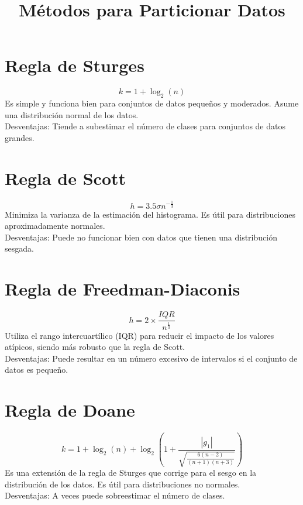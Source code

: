 \documentclass{article}
\title{Métodos para Particionar Datos}
\date{}
\begin{document}
\maketitle

\section{Regla de Sturges}
\begin{equation}
k = 1 + \log_2(n)
\end{equation}
Es simple y funciona bien para conjuntos de datos pequeños y moderados. Asume una distribución normal de los datos. \\
Desventajas: Tiende a subestimar el número de clases para conjuntos de datos grandes.

\section{Regla de Scott}
\begin{equation}
h = 3.5\sigma n^{-\frac{1}{3}}
\end{equation}
Minimiza la varianza de la estimación del histograma. Es útil para distribuciones aproximadamente normales. \\
Desventajas: Puede no funcionar bien con datos que tienen una distribución sesgada.

\section{Regla de Freedman-Diaconis}
\begin{equation}
h = 2 \times \frac{IQR}{n^{\frac{1}{3}}}
\end{equation}
Utiliza el rango intercuartílico (IQR) para reducir el impacto de los valores atípicos, siendo más robusto que la regla de Scott. \\
Desventajas: Puede resultar en un número excesivo de intervalos si el conjunto de datos es pequeño.

\section{Regla de Doane}
\begin{equation}
k = 1 + \log_2(n) + \log_2\left(1 + \frac{|g_1|}{\sqrt{\frac{6(n-2)}{(n+1)(n+3)}}}\right)
\end{equation}
Es una extensión de la regla de Sturges que corrige para el sesgo en la distribución de los datos. Es útil para distribuciones no normales. \\
Desventajas: A veces puede sobreestimar el número de clases.
\end{document}
